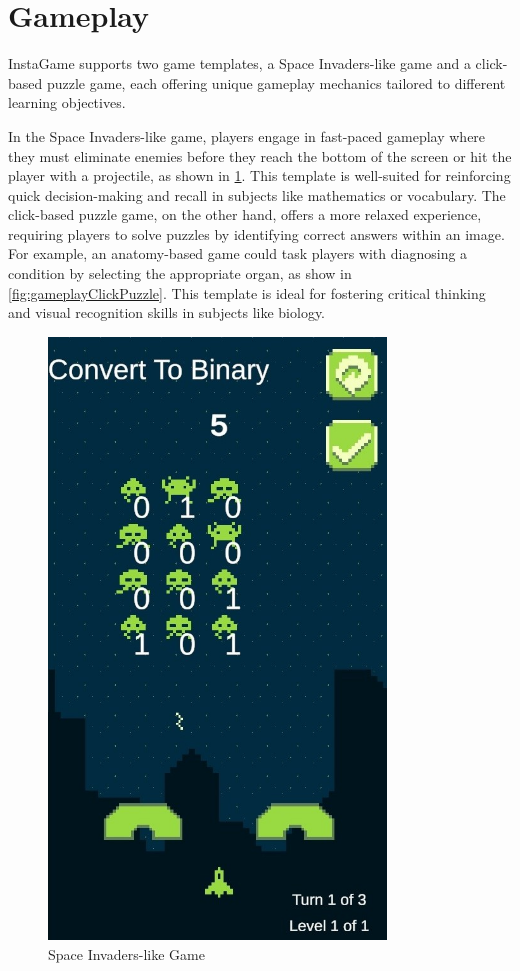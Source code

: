 \section{Gameplay}

InstaGame supports two game templates, a Space Invaders-like game and a click-based puzzle game, each offering unique gameplay mechanics tailored to different learning objectives.

In the Space Invaders-like game, players engage in fast-paced gameplay where they must eliminate enemies before they reach the bottom of the screen or hit the player with a projectile, as shown in \ref{fig:gameplaySpaceInvaders}. This template is well-suited for reinforcing quick decision-making and recall in subjects like mathematics or vocabulary. The click-based puzzle game, on the other hand, offers a more relaxed experience, requiring players to solve puzzles by identifying correct answers within an image. For example, an anatomy-based game could task players with diagnosing a condition by selecting the appropriate organ, as show in \ref{fig:gameplayClickPuzzle}. This template is ideal for fostering critical thinking and visual recognition skills in subjects like biology.

\begin{figure}
	\centering
	\includegraphics[width=0.8\textwidth]{figures/Space_Invaders/Space_Invaders_Game.jpeg}
	\caption{Space Invaders-like Game}
	\label{fig:gameplaySpaceInvaders}
\end{figure}

